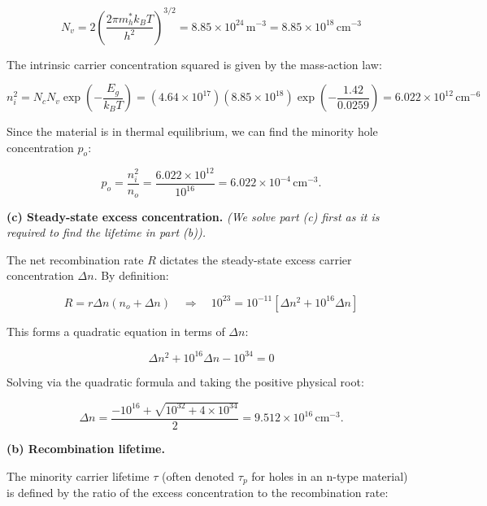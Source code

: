 \begin{equation*}
  N_v = 2 \left( \frac{2\pi m_h^* k_B T}{h^2} \right)^{3/2} = 8.85 \times 10^{24}\,\text{m}^{-3} = 8.85 \times 10^{18}\,\text{cm}^{-3}
\end{equation*}

The intrinsic carrier concentration squared is given by the mass-action law:

\begin{equation*}
  n_i^2 = N_c N_v \exp\left(-\frac{E_g}{k_B T}\right) = (4.64\times 10^{17}) (8.85\times 10^{18}) \exp\left(-\frac{1.42}{0.0259}\right) = 6.022 \times 10^{12}\,\text{cm}^{-6}
\end{equation*}

Since the material is in thermal equilibrium, we can find the minority hole concentration $p_o$:

\begin{equation*}
  \boxed{p_o = \frac{n_i^2}{n_o} = \frac{6.022 \times 10^{12}}{10^{16}} = 6.022 \times 10^{-4}\,\text{cm}^{-3}.}
\end{equation*}

\textbf{(c) Steady-state excess concentration.}
\textit{(We solve part (c) first as it is required to find the lifetime in part (b)).}

The net recombination rate $R$ dictates the steady-state excess carrier concentration $\Delta n$. By definition:

\begin{equation*}
  R = r \Delta n (n_o + \Delta n) \quad\Longrightarrow\quad 10^{23} = 10^{-11} \left[ \Delta n^2 + 10^{16} \Delta n \right]
\end{equation*}

This forms a quadratic equation in terms of $\Delta n$:

\begin{equation*}
  \Delta n^2 + 10^{16} \Delta n - 10^{34} = 0
\end{equation*}

Solving via the quadratic formula and taking the positive physical root:

\begin{equation*}
  \boxed{\Delta n = \frac{-10^{16} + \sqrt{10^{32} + 4\times 10^{34}}}{2} = 9.512 \times 10^{16}\,\text{cm}^{-3}.}
\end{equation*}

\textbf{(b) Recombination lifetime.}

The minority carrier lifetime $\tau$ (often denoted $\tau_p$ for holes in an n-type material) is defined by the ratio of the excess concentration to the recombination rate:


